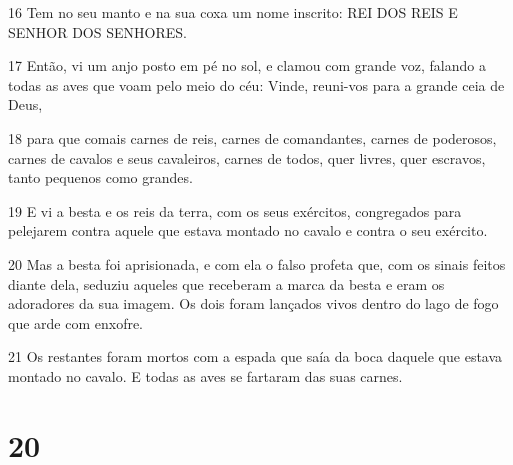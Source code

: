 \par 16 Tem no seu manto e na sua coxa um nome inscrito: REI DOS REIS E SENHOR DOS SENHORES.
\par 17 Então, vi um anjo posto em pé no sol, e clamou com grande voz, falando a todas as aves que voam pelo meio do céu: Vinde, reuni-vos para a grande ceia de Deus,
\par 18 para que comais carnes de reis, carnes de comandantes, carnes de poderosos, carnes de cavalos e seus cavaleiros, carnes de todos, quer livres, quer escravos, tanto pequenos como grandes.
\par 19 E vi a besta e os reis da terra, com os seus exércitos, congregados para pelejarem contra aquele que estava montado no cavalo e contra o seu exército.
\par 20 Mas a besta foi aprisionada, e com ela o falso profeta que, com os sinais feitos diante dela, seduziu aqueles que receberam a marca da besta e eram os adoradores da sua imagem. Os dois foram lançados vivos dentro do lago de fogo que arde com enxofre.
\par 21 Os restantes foram mortos com a espada que saía da boca daquele que estava montado no cavalo. E todas as aves se fartaram das suas carnes.

\chapter{20}

